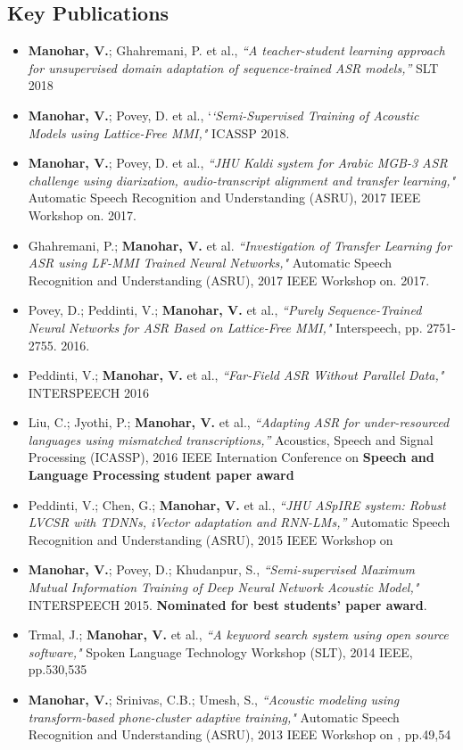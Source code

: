 \documentclass[margin,line,pifont,palatino,courier]{res}
\begin{document}
\begin{resume}
\vspace{-2pt}

\section{\sc Key Publications}
\begin{itemize}
  \item
  \textbf{Manohar, V.}; Ghahremani, P. et al., \textit{``A teacher-student learning approach for unsupervised domain adaptation of sequence-trained ASR models,''} SLT 2018
  \item 
  \textbf{Manohar, V.}; Povey, D. et al., `\textit{`Semi-Supervised Training of Acoustic Models using Lattice-Free MMI,"} ICASSP 2018.
  \item
    \textbf{Manohar, V.}; Povey, D. et al., \textit{``JHU Kaldi system for Arabic MGB-3 ASR challenge using diarization, audio-transcript alignment and transfer learning,"} Automatic Speech Recognition and Understanding (ASRU), 2017 IEEE Workshop on. 2017.
  \item 
  Ghahremani, P.; \textbf{Manohar, V.} et al. \textit{``Investigation of Transfer Learning for ASR using LF-MMI Trained Neural Networks,"} Automatic Speech Recognition and Understanding (ASRU), 2017 IEEE Workshop on. 2017.
  \item
    Povey, D.; Peddinti, V.; \textbf{Manohar, V.} et al., \textit{``Purely Sequence-Trained Neural Networks for ASR Based on Lattice-Free MMI,"} Interspeech, pp. 2751-2755. 2016.
  \item
    Peddinti, V.; \textbf{Manohar, V.} et al., 
    \textit{``Far-Field ASR Without Parallel Data,"}
    INTERSPEECH 2016
  \item 
    Liu, C.; Jyothi, P.; \textbf{Manohar, V.} et al.,
    \textit{``Adapting ASR for under-resourced languages using mismatched
    transcriptions,''}
    Acoustics, Speech and Signal Processing (ICASSP), 2016 IEEE Internation Conference on \textbf{Speech and Language Processing student paper award}
  \item 
    Peddinti, V.; Chen, G.; \textbf{Manohar, V.} et al.,
    \textit{``JHU ASpIRE system: Robust LVCSR with TDNNs, iVector adaptation and
    RNN-LMs,''}
    Automatic Speech Recognition and Understanding (ASRU), 2015 IEEE Workshop
    on
  \item 
    \textbf{Manohar, V.}; Povey, D.; Khudanpur, S., 
    \textit{``Semi-supervised Maximum Mutual Information Training of Deep Neural
    Network Acoustic Model,"}
    INTERSPEECH 2015. \textbf{Nominated for best students' paper award}.
  \item
    Trmal, J.; \textbf{Manohar, V.} et al., 
    \textit{``A keyword search system using open source software," } 
    Spoken Language Technology Workshop (SLT), 2014 IEEE, pp.530,535
  \item
    \textbf{Manohar, V.}; Srinivas, C.B.; Umesh, S., 
    \textit{``Acoustic modeling
    using transform-based phone-cluster adaptive training,"} 
    Automatic Speech Recognition and Understanding (ASRU), 2013 IEEE Workshop on
    , pp.49,54
\end{itemize}

\end{resume}
\end{document}
